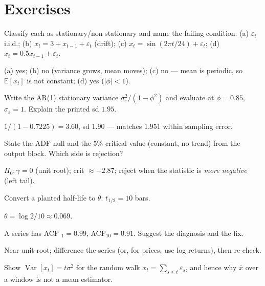 \section*{Exercises}
\begin{exercise}[easy]
Classify each as stationary/non-stationary and name the failing
condition: (a) $\varepsilon_t$ i.i.d.; (b) $x_t=3+x_{t-1}+\varepsilon_t$
(drift); (c) $x_t=\sin(2\pi t/24)+\varepsilon_t$; (d)
$x_t=0.5x_{t-1}+\varepsilon_t$.
\end{exercise}
\begin{solution}
(a) yes; (b) no (variance grows, mean moves); (c) no --- mean is
periodic, so $\mathbb E[x_t]$ is not constant; (d) yes
($|\phi|<1$).
\end{solution}
\begin{exercise}[easy]
Write the AR(1) stationary variance
$\sigma_\varepsilon^2/(1-\phi^2)$ and evaluate at $\phi=0.85$,
$\sigma_\varepsilon=1$. Explain the printed sd $1.95$.
\end{exercise}
\begin{solution}
$1/(1-0.7225)=3.60$, sd $1.90$ --- matches $1.951$ within sampling
error.
\end{solution}
\begin{exercise}[easy]
State the ADF null and the 5\% critical value (constant, no trend)
from the output block. Which side is rejection?
\end{exercise}
\begin{solution}
$H_0:\gamma=0$ (unit root); crit $\approx-2.87$; reject when the
statistic is \emph{more negative} (left tail).
\end{solution}
\begin{exercise}[easy]
Convert a planted half-life to $\theta$: $t_{1/2}=10$ bars.
\end{exercise}
\begin{solution}
$\theta=\log2/10\approx0.069$.
\end{solution}
\begin{exercise}[easy]
A series has ACF $_1=0.99$, ACF$_{10}=0.91$. Suggest the diagnosis
and the fix.
\end{exercise}
\begin{solution}
Near-unit-root; difference the series (or, for prices, use log
returns), then re-check.
\end{solution}
\begin{exercise}[medium]
Show $\operatorname{Var}[x_t]=t\sigma^2$ for the random walk
$x_t=\sum_{s\le t}\varepsilon_s$, and hence why $\bar x$ over a
window is not a mean estimator.
\end{exercise}
